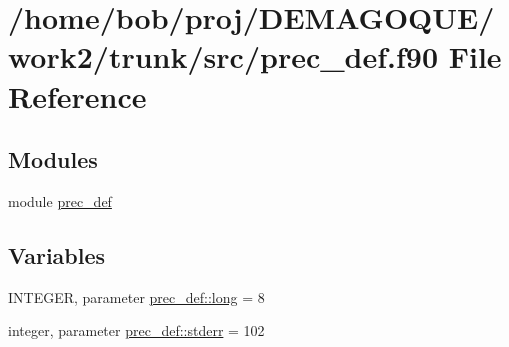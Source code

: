 \hypertarget{prec__def_8f90}{
\section{/home/bob/proj/DEMAGOQUE/work2/trunk/src/prec\_\-def.f90 File Reference}
\label{prec__def_8f90}
}
\subsection*{Modules}
\begin{DoxyCompactItemize}
\item 
module \hyperlink{namespaceprec__def}{prec\_\-def}
\end{DoxyCompactItemize}
\subsection*{Variables}
\begin{DoxyCompactItemize}
\item 
INTEGER, parameter \hyperlink{namespaceprec__def_a1ad8f831ebb7cc8acabdbab351da0cb4}{prec\_\-def::long} = 8
\item 
integer, parameter \hyperlink{namespaceprec__def_aedf88710c9c5e9e8fd7397771275f711}{prec\_\-def::stderr} = 102
\end{DoxyCompactItemize}
